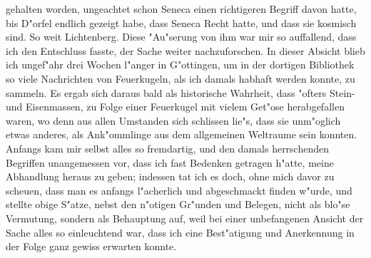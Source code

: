 \documentclass[a4paper, 11pt, oneside, polutonikogreek, german]{article}
\begin{document}
gehalten worden, ungeachtet schon Seneca einen richtigeren Begriff davon hatte, bis D"orfel endlich gezeigt habe, dass Seneca Recht hatte, und dass sie kosmisch sind. So weit Lichtenberg. Diese "Au"serung von ihm war mir so auffallend, dass ich den Entschluss fasste, der Sache weiter nachzuforschen. In dieser Absicht blieb ich ungef"ahr drei Wochen l"anger in G"ottingen, um in der dortigen Bibliothek so viele Nachrichten von Feuerkugeln, als ich damals habhaft werden konnte, zu sammeln. Es ergab sich daraus bald als historische Wahrheit, dass "ofters Stein- und Eisenmassen, zu Folge einer Feuerkugel mit vielem Get"ose herabgefallen waren, wo denn aus allen Umstanden sich schlissen lie"s, dass sie unm"oglich etwas anderes, als Ank"ommlinge aus dem allgemeinen Weltraume sein konnten. Anfangs kam mir selbst alles so fremdartig, und den damals herrschenden Begriffen unangemessen vor, dass ich fast Bedenken getragen h"atte, meine Abhandlung heraus zu geben; indessen tat ich es doch, ohne mich davor zu scheuen, dass man es anfangs l"acherlich und abgeschmackt finden w"urde, und stellte obige S"atze, nebst den n"otigen Gr"unden und Belegen, nicht als blo"se Vermutung, sondern als Behauptung auf, weil bei einer unbefangenen Ansicht der Sache alles so einleuchtend war, dass ich eine Best"atigung und Anerkennung in der Folge ganz gewiss erwarten konnte.
\subsection{}
\end{document}
